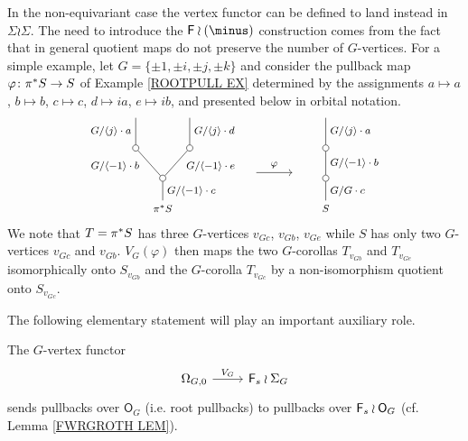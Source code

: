 \documentclass[a4paper,10pt]{article}%
\begin{document}
\begin{remark}\label{NEED_WREATH_REMARK}
In the non-equivariant case the vertex functor can be defined to land instead in $\Sigma \wr \Sigma$.
	The need to introduce the $\Fin \wr (\minus)$ construction comes from the fact that
	in general quotient maps do not preserve the number of $G$-vertices.
	For a simple example, let $G=\{\pm 1, \pm i, \pm j, \pm k\}$ and consider the pullback map 
	$\varphi \colon \pi^{\**} S \to S$ of Example \ref{ROOTPULL EX}
	determined by the assignments
	$a \mapsto a$, $b \mapsto b$, $c \mapsto c$, $d \mapsto i a$, $e \mapsto i b$,	
	and presented below in orbital notation. 
		\[
		\begin{tikzpicture}[grow=up,auto,level distance=2.4em,every node/.style = {font=\footnotesize},dummy/.style={circle,draw,inner sep=0pt,minimum size=1.75mm}]
		\node at (0,0) {$\pi^{\**}S$}
			child{node [dummy] {}
				child{node [dummy] {}
					child{
					edge from parent node [swap] {$G/\langle j \rangle  \cdot d$}}
				edge from parent node[near end,swap] {$G/\langle -1 \rangle  \cdot e$}}
				child{node [dummy] {}
					child{
					edge from parent node {$G/\langle j \rangle  \cdot a$}}
				edge from parent node [near end] {$G/\langle -1 \rangle  \cdot b$}}		
			edge from parent node[swap] {$G/\langle -1 \rangle  \cdot c$}};
		\node at (4.53,0) {$S$}
			child{node [dummy] {}
				child{node [dummy] {}
					child{
					edge from parent node [swap] {$G/\langle j \rangle \cdot a$}}
				edge from parent node [swap] {$G / \langle -1 \rangle \cdot b$}}
			edge from parent node [swap] {$G/G \cdot c$}};
		\draw[->] (2.6,1) -- node [above] {$\varphi$} (3.6,1) ;
		\end{tikzpicture}
		\]
We note that $T = \pi^{\**} S$ has three $G$-vertices $v_{G c}$, $v_{G b}$, $v_{G e}$ while $S$ has only two $G$-vertices $v_{G c}$ and $v_{G b}$. $V_G(\varphi)$ then maps the two $G$-corollas 
$T_{v_{G b}}$ and $T_{v_{G e}}$
isomorphically onto $S_{v_{G b}}$
and the $G$-corolla $T_{v_{Gc}}$ by a non-isomorphism quotient onto $S_{v_{G c}}$.
\end{remark}


The following elementary statement will play an important auxiliary role.

\begin{lemma}\label{VGPULL LEM}
The $G$-vertex functor
\[
\begin{tikzcd}
	\Omega_{G,0} \ar{r}{V_G} & \Fin_s \wr \Sigma_G
\end{tikzcd}
\]
sends pullbacks over $\mathsf{O}_G$ (i.e. root pullbacks)
to pullbacks over $\mathsf{F}_s \wr \mathsf{O}_G$
(cf. Lemma \ref{FWRGROTH LEM}).
\end{lemma}
\end{document}
